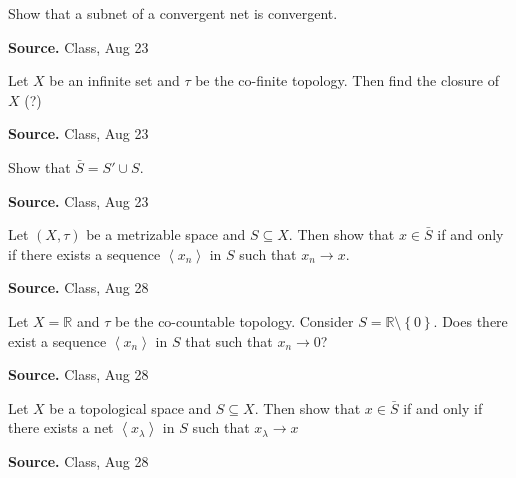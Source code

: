 \documentclass[12pt,twoside]{report}
\newenvironment*{source}{\hfill\scriptsize\textbf{Source.}\space}{\par}
\begin{document}
\begin{samepage}
\begin{ex}
Show that a subnet of a convergent net is convergent.
\end{ex}
\begin{source}
Class, Aug 23
\end{source}
\end{samepage}

\begin{samepage}
\begin{ex}
Let $X$ be an infinite set and $\tau$ be the co-finite topology. Then find the closure of $X$ (?)
\end{ex}
\begin{source}
Class, Aug 23
\end{source}
\end{samepage}

\begin{samepage}
\begin{ex}
Show that $\bar{S} = S' \cup S$.
\end{ex}
\begin{source}
Class, Aug 23
\end{source}
\end{samepage}

\begin{samepage}
\begin{ex}
Let $\left (X, \tau\right )$ be a metrizable space and $S \subseteq X$. Then show that $x \in \bar{S}$ if and only if there exists a sequence $\left\langle x_n\right\rangle $ in $S$ such that $x_n \to x$.
\end{ex}
\begin{source}
Class, Aug 28
\end{source}
\end{samepage}

\begin{samepage}
\begin{ex}
Let $X = \mathbb{R}$ and $\tau$ be the co-countable topology. Consider $S = \mathbb{R} \setminus \left\{ 0 \right\}$.
Does there exist a sequence $\left\langle  x_n \right\rangle $ in $S$ that such that $x_n \to 0$?
\end{ex}
\begin{source}
Class, Aug 28
\end{source}
\end{samepage}

\begin{samepage}
\begin{ex}
Let $X$ be a topological space and $S \subseteq X$. Then show that $x \in \bar{S}$ if and only if there exists a net $\left\langle  x_\lambda \right\rangle $ in $S$ such that $ x_\lambda \to x$
\end{ex}
\begin{source}
Class, Aug 28
\end{source}
\end{samepage}
\end{document}
